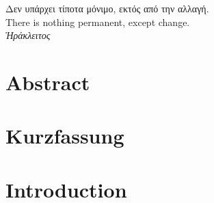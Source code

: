 \newcommand{\myKeywordStyle}[1]{{\footnotesize\sffamily\color{green!70!black} #1}}
 
\newcommand{\myGlobalStyle}[1]{{\footnotesize\sffamily\color{blue!100!black} #1}}
 
\newcommand{\myNumberStyle}[1]{{\footnotesize\sffamily\color{brown!100!black} #1}}









\frontmatter


\newpage
\thispagestyle{empty}
\begin{center}

\hspace{0pt}
\vfill

\Large\foreignlanguage{greek}{Δεν υπάρχει τίποτα μόνιμο, εκτός από την αλλαγή.\\}
\vspace{0.5cm}
\normalsize{There is nothing permanent, except change.\\}
\vspace{1cm}
\color{auburn}\foreignlanguage{greek}{\textit{Ἡράκλειτος}}
\vfill
\hspace{0pt}
\end{center}


\chapter*{Abstract}
\chapter*{Kurzfassung}
%
\mainmatter
\chapter{Introduction}
\label{chap:intro}



